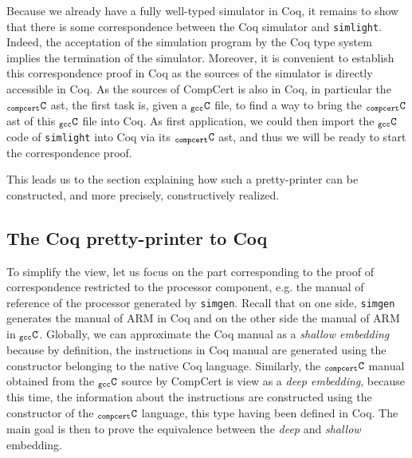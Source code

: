 \documentclass[a4paper, 11pt]{article}
\newcommand{\simlight}{{\tt simlight}\xspace}
\newcommand{\simgen}{{\tt simgen}\xspace}
\newcommand{\C}{$_{\tt compcert}{\tt C}$\xspace}
\newcommand{\gccC}{$_{\tt gcc}{\tt C}$\xspace}
\begin{document}
Because we already have a fully well-typed simulator in Coq, it remains to show that there is some correspondence between the Coq simulator and \simlight. Indeed, the acceptation of the simulation program by the Coq type system implies the termination of the simulator. Moreover, it is convenient to establish this correspondence proof in Coq as the sources of the simulator is directly accessible in Coq. As the sources of CompCert is also in Coq, in particular the \C ast, the first task is, given a \gccC file, to find a way to bring the \C ast of this \gccC file into Coq. As first application, we could then import the \gccC code of \simlight into Coq via its \C ast, and thus we will be ready to start the correspondence proof.

This leads us to the section explaining how such a pretty-printer can be constructed, and more precisely, constructively realized.
\subsection{The Coq pretty-printer to Coq}
To simplify the view, let us focus on the part corresponding to the proof of correspondence restricted to the processor component, e.g. the manual of reference of the processor generated by \simgen. Recall that on one side, \simgen generates the manual of ARM in Coq and on the other side the manual of ARM in \gccC. Globally, we can approximate the Coq manual as a \emph{shallow embedding} because by definition, the instructions in Coq manual are generated using the constructor belonging to the native Coq language. Similarly, the \C manual obtained from the \gccC source by CompCert is view as a \emph{deep embedding}, because this time, the information about the instructions are constructed using the constructor of the \C language, this type having been defined in Coq. The main goal is then to prove the equivalence between the \emph{deep} and \emph{shallow} embedding.
\end{document}
